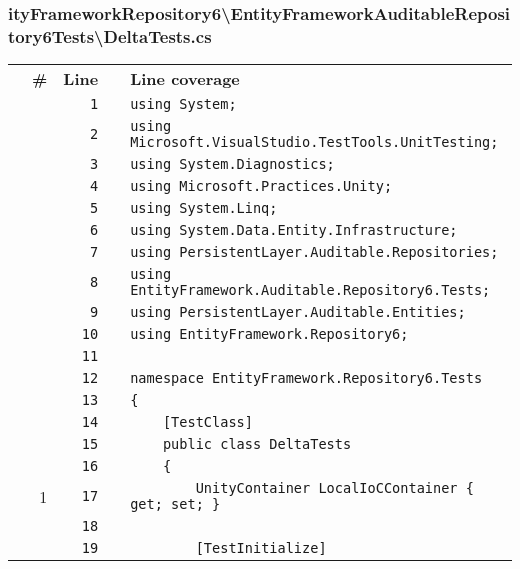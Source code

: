 \documentclass[a4paper,10pt]{article}
\begin{document}
\subsubsection{ityFrameworkRepository6\textbackslash EntityFrameworkAuditableRepository6Tests\textbackslash DeltaTests.cs}
\begin{longtable}[l]{lrrll}
\textbf{} & \textbf{\#} & \textbf{Line} & \textbf{} & \textbf{Line coverage}\\
\cellcolor{gray} &  & \verb~1~ & & \verb~using System;~\\
\cellcolor{gray} &  & \verb~2~ & & \verb~using Microsoft.VisualStudio.TestTools.UnitTesting;~\\
\cellcolor{gray} &  & \verb~3~ & & \verb~using System.Diagnostics;~\\
\cellcolor{gray} &  & \verb~4~ & & \verb~using Microsoft.Practices.Unity;~\\
\cellcolor{gray} &  & \verb~5~ & & \verb~using System.Linq;~\\
\cellcolor{gray} &  & \verb~6~ & & \verb~using System.Data.Entity.Infrastructure;~\\
\cellcolor{gray} &  & \verb~7~ & & \verb~using PersistentLayer.Auditable.Repositories;~\\
\cellcolor{gray} &  & \verb~8~ & & \verb~using EntityFramework.Auditable.Repository6.Tests;~\\
\cellcolor{gray} &  & \verb~9~ & & \verb~using PersistentLayer.Auditable.Entities;~\\
\cellcolor{gray} &  & \verb~10~ & & \verb~using EntityFramework.Repository6;~\\
\cellcolor{gray} &  & \verb~11~ & & \verb~~\\
\cellcolor{gray} &  & \verb~12~ & & \verb~namespace EntityFramework.Repository6.Tests~\\
\cellcolor{gray} &  & \verb~13~ & & \verb~{~\\
\cellcolor{gray} &  & \verb~14~ & & \verb~    [TestClass]~\\
\cellcolor{gray} &  & \verb~15~ & & \verb~    public class DeltaTests~\\
\cellcolor{gray} &  & \verb~16~ & & \verb~    {~\\
\cellcolor{green} & 1 & \verb~17~ & & \verb~        UnityContainer LocalIoCContainer { get; set; }~\\
\cellcolor{gray} &  & \verb~18~ & & \verb~~\\
\cellcolor{gray} &  & \verb~19~ & & \verb~        [TestInitialize]~\\

\end{longtable}
\end{document}
